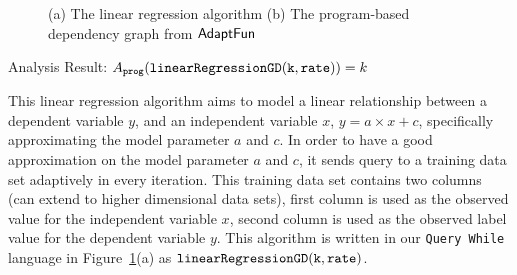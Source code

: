 \begin{example}
\begin{figure}
\begin{subfigure}{.5\textwidth}
\begin{centering}
         \caption{}
            \end{centering}
            \end{subfigure}
    \vspace{-0.5cm}
    \caption{(a) The linear regression algorithm 
    (b) The program-based dependency graph from $\textsf{AdaptFun}$}
    \vspace{-0.5cm}
    \label{fig:linear_regression}
\end{figure}
%
Analysis Result: $ A_{\mathtt{prog}}(\mathtt{linearRegressionGD(k, rate)}) = k$
\end{example} 
%
 
This linear regression algorithm 
aims to
model a linear relationship between a dependent variable $y$,
and an independent variable $x$, $y = a \times x + c$, specifically approximating the 
model parameter $a$ and $c$.
In order to have a good approximation on the model parameter 
$a$ and $c$, 
it sends query to a training data set adaptively in every iteration.
This training data set contains two columns (can extend to higher dimensional data sets), first column is used as the observed value for the independent variable $x$,
second column is used as the observed label value for the dependent variable $y$.
This algorithm is written in our {\tt Query While} language in Figure~\ref{fig:linear_regression}(a) as $\mathtt{linearRegressionGD(k, rate)}$.
%

